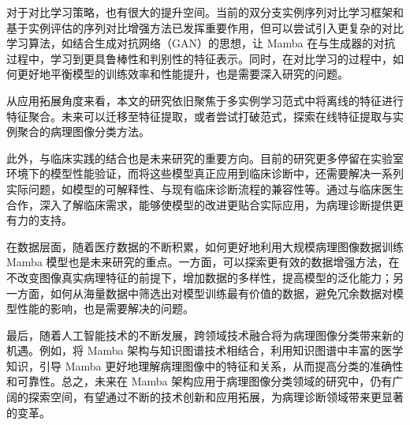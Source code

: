 对于对比学习策略，也有很大的提升空间。当前的双分支实例序列对比学习框架和基于实例评估的序列对比增强方法已发挥重要作用，但可以尝试引入更复杂的对比学习算法，如结合生成对抗网络（GAN）的思想，让 Mamba 在与生成器的对抗过程中，学习到更具鲁棒性和判别性的特征表示。同时，在对比学习的过程中，如何更好地平衡模型的训练效率和性能提升，也是需要深入研究的问题。​

从应用拓展角度来看，本文的研究依旧聚焦于多实例学习范式中将离线的特征进行特征聚合。未来可以迁移至特征提取，或者尝试打破范式，探索在线特征提取与实例聚合的病理图像分类方法。

此外，与临床实践的结合也是未来研究的重要方向。目前的研究更多停留在实验室环境下的模型性能验证，而将这些模型真正应用到临床诊断中，还需要解决一系列实际问题，如模型的可解释性、与现有临床诊断流程的兼容性等。通过与临床医生合作，深入了解临床需求，能够使模型的改进更贴合实际应用，为病理诊断提供更有力的支持。​

在数据层面，随着医疗数据的不断积累，如何更好地利用大规模病理图像数据训练 Mamba 模型也是未来研究的重点。一方面，可以探索更有效的数据增强方法，在不改变图像真实病理特征的前提下，增加数据的多样性，提高模型的泛化能力；另一方面，如何从海量数据中筛选出对模型训练最有价值的数据，避免冗余数据对模型性能的影响，也是需要解决的问题。​

最后，随着人工智能技术的不断发展，跨领域技术融合将为病理图像分类带来新的机遇。例如，将 Mamba 架构与知识图谱技术相结合，利用知识图谱中丰富的医学知识，引导 Mamba 更好地理解病理图像中的特征和关系，从而提高分类的准确性和可靠性。总之，未来在 Mamba 架构应用于病理图像分类领域的研究中，仍有广阔的探索空间，有望通过不断的技术创新和应用拓展，为病理诊断领域带来更显著的变革。